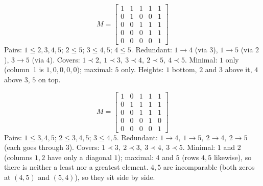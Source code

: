 \documentclass{fkt-notes}
\theoremstyle{definition}
\begin{document}
\begin{example}[a branch]
  \[
    M=\begin{bmatrix}
      1 & 1 & 1 & 1 & 1 \\ 0&1&0&0&1\\ 0&0&1&1&1\\ 0&0&0&1&1\\ 0&0&0&0&1
    \end{bmatrix}
  \]
  Pairs: $1\le2,3,4,5$; $2\le5$; $3\le4,5$; $4\le5$. Redundant:
  $1\to4$ (via $3$), $1\to5$ (via $2$), $3\to5$ (via $4$). Covers:
  $1\prec2,\ 1\prec3,\ 3\prec4,\ 2\prec5,\ 4\prec5$. Minimal: $1$ only
  (column~1 is $1,0,0,0,0$); maximal: $5$ only. Heights: $1$ bottom, $2$
  and $3$ above it, $4$ above $3$, $5$ on top.
  \begin{center}
  \end{center}
\end{example}

\begin{example}
  \[
    M=\begin{bmatrix}
      1 & 0 & 1 & 1 & 1 \\ 0&1&1&1&1\\ 0&0&1&1&1\\ 0&0&0&1&0\\ 0&0&0&0&1
    \end{bmatrix}
  \]
  Pairs: $1\le3,4,5$; $2\le3,4,5$; $3\le4,5$. Redundant: $1\to4,\
    1\to5,\ 2\to4,\ 2\to5$ (each goes through $3$). Covers: $1\prec3,\
    2\prec3,\ 3\prec4,\ 3\prec5$. Minimal: $1$ and $2$ (columns $1,2$ have
  only a diagonal $1$); maximal: $4$ and $5$ (rows $4,5$ likewise), so
  there is neither a least nor a greatest element. $4,5$ are
  incomparable (both zeros at $(4,5)$ and $(5,4)$), so they sit side by
  side.
  \begin{center}
  \end{center}
\end{example}
\end{document}
